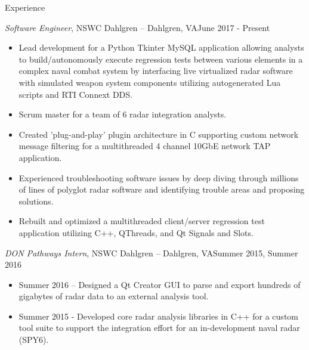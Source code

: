 \documentclass[calibri]{mcdowellcv}
\begin{document}
	\makeheader
	
	\begin{cvsection}{Experience}
		\begin{cvsubsection}{\textit{Software Engineer}, NSWC Dahlgren -- Dahlgren, VA}{June 2017 - Present}
			\begin{itemize}
				\item Lead development for a Python Tkinter MySQL application allowing analysts to build/autonomously execute regression tests between various elements in a complex naval combat system by interfacing live virtualized radar software with simulated weapon system components utilizing autogenerated Lua scripts and RTI Connext DDS. 
				\item Scrum master for a team of 6 radar integration analysts.
				\item Created 'plug-and-play' plugin architecture in C supporting custom network message filtering for a multithreaded 4 channel 10GbE network TAP application.  
				\item Experienced troubleshooting software issues by deep diving through millions of lines of polyglot radar software and identifying trouble areas and proposing solutions.  
				\item Rebuilt and optimized a multithreaded client/server regression test application utilizing C++, QThreads, and Qt Signals and Slots.   
			\end{itemize}
		\end{cvsubsection}
		
		\begin{cvsubsection}{\textit{DON Pathways Intern}, NSWC Dahlgren -- Dahlgren, VA}{Summer 2015, Summer 2016}	
			\begin{itemize}
				\item Summer 2016 -- Designed a Qt Creator GUI to parse and export hundreds of gigabytes of radar data to an external analysis tool.  
				\item Summer 2015 - Developed core radar analysis libraries in C++ for a custom tool suite to support the integration effort for an in-development naval radar (SPY6).  
			\end{itemize}
		\end{cvsubsection}
	\end{cvsection}
	
\end{document}
